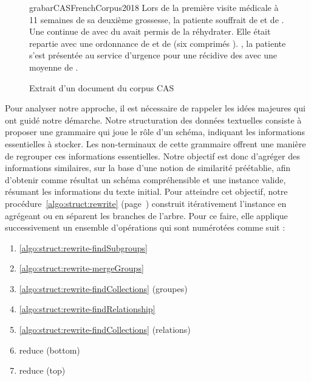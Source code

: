 \begin{figure}[htb]
    \begin{displaycquote}{grabarCASFrenchCorpus2018}
        Lors de la première visite médicale à 11 semaines de sa deuxième grossesse, la patiente souffrait de  et de  .
        Une  continue de  avec du  avait permis de la réhydrater.
        Elle était repartie avec une ordonnance de  et de  (six comprimés ).
        , la patiente s'est présentée au service d'urgence pour une récidive des  avec une moyenne de .
    \end{displaycquote}
    \caption{Extrait d'un document du corpus CAS}
    \label{fig:struct:cas}
\end{figure}

Pour analyser notre approche, il est nécessaire de rappeler les idées majeures qui ont guidé notre démarche.
Notre structuration des données textuelles consiste à proposer une grammaire qui joue le rôle d'un schéma, indiquant les informations essentielles à stocker.
Les non-terminaux de cette grammaire offrent une manière de regrouper ces informations essentielles.
Notre objectif est donc d'agréger des informations similaires, sur la base d'une notion de similarité préétablie, afin d'obtenir comme résultat un schéma compréhensible et une instance valide, résumant les informations du texte initial.
Pour atteindre cet objectif, notre procédure~\ref{algo:struct:rewrite} (page~\pageref{algo:struct:rewrite}) construit itérativement l'instance en agrégeant ou en séparent les branches de l'arbre.
Pour ce faire, elle applique successivement un ensemble d'opérations qui sont numérotées comme suit :
\begin{multicols}{2}
    \begin{enumerate}
        \item \ref{algo:struct:rewrite-findSubgroups}
        \item \ref{algo:struct:rewrite-mergeGroups}
        \item \ref{algo:struct:rewrite-findCollections} (groupes)
        \item \ref{algo:struct:rewrite-findRelationship}
        \item \ref{algo:struct:rewrite-findCollections} (relations)
        \item \textsf{reduce} (bottom)
        \item \textsf{reduce} (top)
    \end{enumerate}
\end{multicols}

